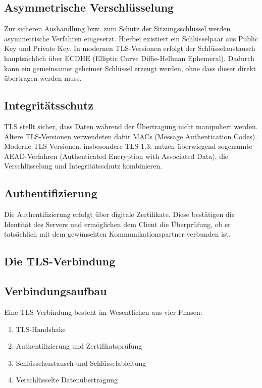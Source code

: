 \subsection*{Asymmetrische Verschlüsselung}
Zur sicheren Aushandlung bzw. zum Schutz der Sitzungsschlüssel werden asymmetrische Verfahren eingesetzt. Hierbei existiert ein Schlüsselpaar aus Public Key und Private Key.
In modernen TLS-Versionen erfolgt der Schlüsselaustausch hauptsächlich über ECDHE (Elliptic Curve Diffie-Hellman Ephemeral). Dadurch kann ein gemeinsamer geheimer Schlüssel erzeugt werden, ohne dass dieser direkt übertragen werden muss.

\subsection*{Integritätsschutz}
TLS stellt sicher, dass Daten während der Übertragung nicht manipuliert werden. Ältere TLS-Versionen verwendeten dafür MACs (Message Authentication Codes). Moderne TLS-Versionen. insbesondere TLS 1.3, nutzen überwiegend sogenannte AEAD-Verfahren (Authenticated Encryption with Associated Data), die Verschlüsselung und Integritätsschutz kombinieren.

\subsection*{Authentifizierung}
Die Authentifizierung erfolgt über digitale Zertifikate. Diese bestätigen die Identität des Servers und ermöglichen dem Client die Überprüfung, ob er tatsächlich mit dem gewünschten Kommunikationspartner verbunden ist.


\subsection{Die TLS-Verbindung}
\subsection*{Verbindungsaufbau}
Eine TLS-Verbindung besteht im Wesentlichen aus vier Phasen:
\begin{enumerate}
  \item TLS-Handshake
  \item Authentifizierung und Zertifikatsprüfung
  \item Schlüsselaustausch und Schlüsselableitung
  \item Verschlüsselte Datenübertragung
\end{enumerate}


